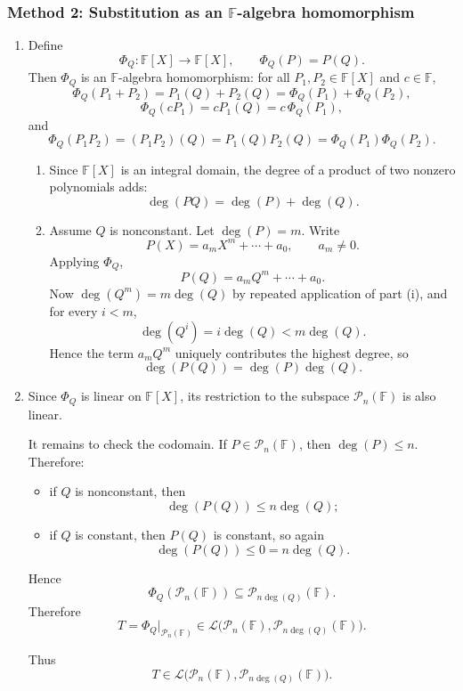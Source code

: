 \documentclass[12pt]{article}
\newcommand{\F}{\mathbb{F}}
\newcommand{\cL}{\mathcal{L}}
\newcommand{\cP}{\mathcal{P}}
\begin{document}
\subsubsection{Method 2: Substitution as an \(\F\)-algebra homomorphism}
\begin{enumerate}[label=(\alph*)]
\item Define
\[
\Phi_Q:\F[X]\to\F[X],\qquad \Phi_Q(P)=P(Q).
\]
Then \(\Phi_Q\) is an \(\F\)-algebra homomorphism: for all \(P_1,P_2\in\F[X]\) and \(c\in\F\),
\[
\Phi_Q(P_1+P_2)=P_1(Q)+P_2(Q)=\Phi_Q(P_1)+\Phi_Q(P_2),
\]
\[
\Phi_Q(cP_1)=cP_1(Q)=c\,\Phi_Q(P_1),
\]
and
\[
\Phi_Q(P_1P_2)=(P_1P_2)(Q)=P_1(Q)P_2(Q)=\Phi_Q(P_1)\Phi_Q(P_2).
\]

\begin{enumerate}[label=(\roman*)]
\item Since \(\F[X]\) is an integral domain, the degree of a product of two nonzero polynomials adds:
\[
\boxed{\deg(PQ)=\deg(P)+\deg(Q).}
\]

\item Assume \(Q\) is nonconstant. Let \(\deg(P)=m\). Write
\[
P(X)=a_mX^m+\cdots+a_0,\qquad a_m\neq 0.
\]
Applying \(\Phi_Q\),
\[
P(Q)=a_mQ^m+\cdots+a_0.
\]
Now \(\deg(Q^m)=m\deg(Q)\) by repeated application of part (i), and for every \(i<m\),
\[
\deg(Q^i)=i\deg(Q)<m\deg(Q).
\]
Hence the term \(a_mQ^m\) uniquely contributes the highest degree, so
\[
\boxed{\deg(P(Q))=\deg(P)\deg(Q).}
\]
\end{enumerate}

\item Since \(\Phi_Q\) is linear on \(\F[X]\), its restriction to the subspace \(\cP_n(\F)\) is also linear.

It remains to check the codomain. If \(P\in \cP_n(\F)\), then \(\deg(P)\le n\). Therefore:
\begin{itemize}[leftmargin=*]
\item if \(Q\) is nonconstant, then
\[
\deg(P(Q))\le n\deg(Q);
\]
\item if \(Q\) is constant, then \(P(Q)\) is constant, so again
\[
\deg(P(Q))\le 0=n\deg(Q).
\]
\end{itemize}
Hence
\[
\Phi_Q(\cP_n(\F))\subseteq \cP_{n\deg(Q)}(\F).
\]
Therefore
\[
T=\Phi_Q|_{\cP_n(\F)}\in \cL\bigl(\cP_n(\F),\cP_{n\deg(Q)}(\F)\bigr).
\]

Thus
\[
\boxed{T\in \cL\bigl(\cP_n(\F),\cP_{n\deg(Q)}(\F)\bigr).}
\]
\end{enumerate}
\end{document}
